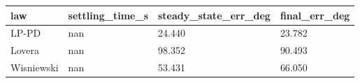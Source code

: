\begin{tabular}{llll}
\hline
law & settling\_time\_s & steady\_state\_err\_deg & final\_err\_deg \\
\hline
LP-PD & nan & 24.440 & 23.782 \\
Lovera & nan & 98.352 & 90.493 \\
Wisniewski & nan & 53.431 & 66.050 \\
\hline
\end{tabular}
